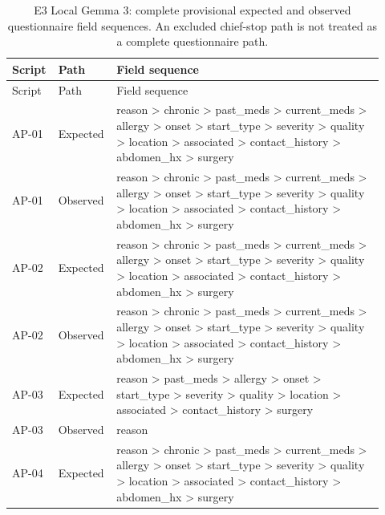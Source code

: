 \begingroup\small\setlength{\tabcolsep}{3pt}\renewcommand{\arraystretch}{1.15}
\begin{longtable}{>{\raggedright\arraybackslash}p{0.1\linewidth}>{\raggedright\arraybackslash}p{0.12\linewidth}>{\raggedright\arraybackslash}p{0.7\linewidth}}
\caption{E3 Local Gemma 3: complete provisional expected and observed questionnaire field sequences. An excluded chief-stop path is not treated as a complete questionnaire path.}\label{sup:e3pathslocal}\\\hline
Script & Path & Field sequence \\ \hline
\endfirsthead
\hline
Script & Path & Field sequence \\ \hline
\endhead
\hline\endfoot
\hline\endlastfoot
AP-\allowbreak{}01 & Expected & reason > chronic > past\_\allowbreak{}meds > current\_\allowbreak{}meds > allergy > onset > start\_\allowbreak{}type > severity > quality > location > associated > contact\_\allowbreak{}history > abdomen\_\allowbreak{}hx > surgery \\
AP-\allowbreak{}01 & Observed & reason > chronic > past\_\allowbreak{}meds > current\_\allowbreak{}meds > allergy > onset > start\_\allowbreak{}type > severity > quality > location > associated > contact\_\allowbreak{}history > abdomen\_\allowbreak{}hx > surgery \\
AP-\allowbreak{}02 & Expected & reason > chronic > past\_\allowbreak{}meds > current\_\allowbreak{}meds > allergy > onset > start\_\allowbreak{}type > severity > quality > location > associated > contact\_\allowbreak{}history > abdomen\_\allowbreak{}hx > surgery \\
AP-\allowbreak{}02 & Observed & reason > chronic > past\_\allowbreak{}meds > current\_\allowbreak{}meds > allergy > onset > start\_\allowbreak{}type > severity > quality > location > associated > contact\_\allowbreak{}history > abdomen\_\allowbreak{}hx > surgery \\
AP-\allowbreak{}03 & Expected & reason > past\_\allowbreak{}meds > allergy > onset > start\_\allowbreak{}type > severity > quality > location > associated > contact\_\allowbreak{}history > surgery \\
AP-\allowbreak{}03 & Observed & reason \\
AP-\allowbreak{}04 & Expected & reason > chronic > past\_\allowbreak{}meds > current\_\allowbreak{}meds > allergy > onset > start\_\allowbreak{}type > severity > quality > location > associated > contact\_\allowbreak{}history > abdomen\_\allowbreak{}hx > surgery \\

\end{longtable}

